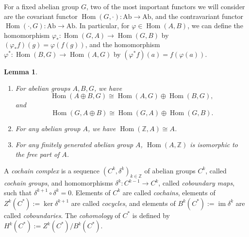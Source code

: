 \documentclass{book}
\newcommand{\bbZ}{\mathbb{Z}}
\renewcommand{\phi}{\varphi}
\DeclareMathOperator{\im}{im}
\DeclareMathOperator{\Hom}{Hom}
\newtheorem{lemma}[theorem]{Lemma}
\theoremstyle{definition}
\theoremstyle{remark}
\numberwithin{equation}{section}
\begin{document}
For a fixed abelian group $G$, two of the most important functors we will consider are the covariant functor $\Hom(G,\cdot) \colon \mathrm{Ab} \to \mathrm{Ab}$, and the contravariant functor $\Hom(\cdot,G) \colon \mathrm{Ab} \to \mathrm{Ab}$. In particular, for $\phi \in \Hom(A,B)$, we can define the homomorphism $\phi_* \colon \Hom(G,A) \to \Hom(G,B)$ by $(\phi_* f)(g) = \phi(f(g))$, and the homomorphism $\phi^* \colon \Hom(B,G) \to \Hom(A,G)$ by $(\phi^*f)(a) = f(\phi(a))$.
\begin{lemma}
    \begin{enumerate}[label=\rm{(\arabic*)}]
        \item For abelian groups $A,B,G$, we have 
        \begin{equation}
            \Hom(A \oplus B, G) \cong \Hom(A,G) \oplus \Hom(B,G),
        \end{equation}
        and 
        \begin{equation}
            \Hom(G,A \oplus B) \cong \Hom(G,A) \oplus \Hom(G,B).
        \end{equation}
        \item For any abelian group $A$, we have $\Hom(\bbZ,A) \cong A$.
        \item For any finitely generated abelian group $A$, $\Hom(A,\bbZ)$ is isomorphic to the free part of $A$.
    \end{enumerate}
\end{lemma}

A \textit{cochain complex} is a sequence $(C^k,\delta^k)_{k \in \bbZ}$ of abelian groups $C^k$, called \textit{cochain groups}, and homomorphisms $\delta^k \colon C^{k-1} \to C^k$, called \textit{coboundary maps}, such that $\delta^{k+1} \circ \delta^k = 0$. Elements of $C^k$ are called \textit{cochains}, elements of $Z^k(C^*) := \ker{\delta^{k+1}}$ are called \textit{cocycles}, and elements of $B^k(C^*) := \im{\delta^k}$ are called \textit{coboundaries}. The \textit{cohomology} of $C^*$ is defined by $H^k(C^*) := Z^k(C^*)/B^k(C^*)$.
\end{document}
